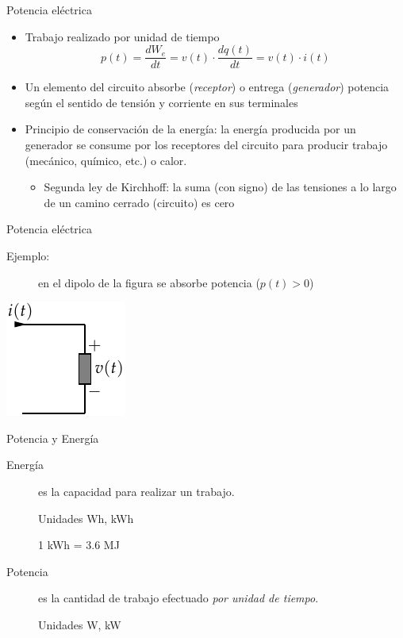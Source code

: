 \documentclass[xcolor={usenames,svgnames,dvipsnames}]{beamer}
\begin{document}
\begin{frame}[label={sec:org33f1860}]{Potencia eléctrica}
\begin{itemize}
\item Trabajo realizado por unidad de tiempo
$$p(t)=\frac{dW_{e}}{dt}=v(t)\cdot\frac{dq(t)}{dt}=v(t)\cdot i(t)$$

\item Un elemento del circuito absorbe (\emph{receptor}) o entrega (\emph{generador})
potencia según el sentido de tensión y corriente en sus terminales

\item \alert{Principio de conservación de la energía}: la energía producida por
un generador se consume por los receptores del circuito para producir
trabajo (mecánico, químico, etc.) o calor.

\begin{itemize}
\item Segunda ley de Kirchhoff: la suma (con signo) de las tensiones a
lo largo de un camino cerrado (circuito) es cero
\end{itemize}
\end{itemize}
\end{frame}

\begin{frame}[label={sec:orge346591}]{Potencia eléctrica}
\begin{description}
\item[{Ejemplo:}] en el dipolo de la figura se absorbe potencia (\(p(t)>0\))
\end{description}
\begin{center}
\includegraphics[height=0.5\textheight]{../figs/ReceptorPasivo.pdf}
\end{center}
\end{frame}

\begin{frame}[label={sec:org2c1a7d9}]{Potencia y Energía}
\begin{description}
\item[{Energía}] es la capacidad para realizar un trabajo.

Unidades Wh, kWh

1 kWh = 3.6 MJ

\item[{Potencia}] es la cantidad de trabajo efectuado \emph{por unidad de
tiempo}.

Unidades W, kW
\end{description}
\end{frame}
\end{document}
